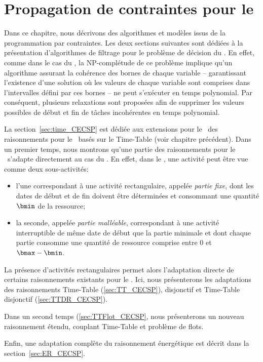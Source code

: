 \chapter{Propagation de contraintes pour le 
\CECSP}
\label{sec:PPC_CECSP}
Dans ce chapitre, nous décrivons des algorithmes et modèles issus de
la programmation par contraintes. Les deux sections suivantes sont
dédiées à la présentation d'algorithmes de filtrage pour le problème
de décision du \CECSP. En effet, comme dans le cas du \CUSP, la
NP-complétude de ce problème implique qu'un algorithme assurant la
cohérence des bornes de chaque variable -- garantissant l'existence
d'une solution où les valeurs de chaque variable sont comprises dans
l'intervalles défini par ces bornes -- ne peut s'exécuter en temps
polynomial. Par conséquent, plusieurs relaxations sont proposées afin
de supprimer les valeurs possibles de début et fin de tâches
incohérentes en temps polynomial.

La section~\ref{sec:time_CECSP} est dédiée aux extensions pour le
\CECSP~des raisonnements pour le \CUSP~basés sur le Time-Table (voir
chapitre précédent). Dans un premier temps, nous montrons qu'une
partie des raisonnements pour le \CUSP~s'adapte directement au cas du
\CECSP. En effet, dans le \CECSP, une activité peut être vue comme
deux sous-activités:
\begin{itemize}
\item l'une correspondant à une activité rectangulaire, appelée {\it
partie fixe}, dont les dates de début et de fin doivent être
déterminées et consommant une quantité $\bmin$ de la ressource;
\item la seconde, appelée {\it partie malléable}, correspondant à une
activité interruptible de même date de début que la partie minimale et
dont chaque partie consomme une quantité de ressource comprise entre
$0$ et $\bmax-\bmin$.
\end{itemize}
La présence d'activités rectangulaires permet alors l'adaptation directe
de certains raisonnements existants pour le \CUSP. Ici, nous
présenterons les adaptations des raisonnements Time-Table
(\ref{sec:TT_CECSP}), disjonctif et Time-Table disjonctif
(\ref{sec:TTDR_CECSP}).  

Dans un second temps (\ref{sec:TTFlot_CECSP}, nous présenterons un nouveau
raisonnement étendu, couplant Time-Table et problème de flots. 

Enfin, une adaptation complète du raisonnement énergétique est décrit
dans la section~\ref{sec:ER_CECSP}.






